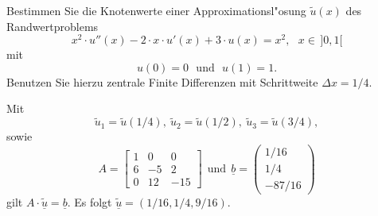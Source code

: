 Bestimmen Sie die Knotenwerte einer Approximationsl"osung $\tilde u(x)$
des Randwertproblems
\[
x^2 \cdot u''(x) - 2 \cdot x \cdot u'(x) + 3 \cdot u(x) = x^2, \ \ \ x \in\, ]0,1[
\]
mit
\[
u(0) = 0 \ \ \ \text{und} \ \ \ u(1) = 1.
\]
Benutzen Sie hierzu zentrale Finite Differenzen mit Schrittweite $\Delta x = 1/4$. 

\begin{loesung}
Mit 
\[
\tilde u_1 = \tilde u(1/4), \ \tilde u_2 = \tilde u(1/2), \ \tilde u_3 = \tilde u(3/4),
\]
sowie 
\[
A = \left[\begin{array}{rrr} 
1 & 0 & 0 \\
6 & -5 & 2 \\
0 & 12 & -15 \end{array}\right] \ \ \text{und} \ \
\underline{b} =  \left(\begin{array}{c} 1/16 \\ 1/4 \\ -87/16 \end{array}\right)
\]
gilt
$A \cdot \underline{\tilde u} = \underline{b}$.
Es folgt $\underline{\tilde u} = (1/16, 1/4, 9/16)$.
\end{loesung}


